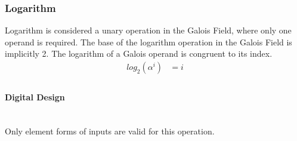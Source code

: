 \subsubsection{Logarithm} Logarithm is considered a unary operation in the
Galois Field, where only one operand is required. The base of the logarithm
operation in the Galois Field is implicitly 2. The logarithm of a Galois
operand is congruent to its index.
    \begin{equation*}
        \begin{split}
            log_{2}(\alpha^{i}) & = i \\
        \end{split}
    \end{equation*}

    \paragraph{{\small Digital Design}} \leavevmode \\ Only element forms of
    inputs are valid for this operation.
